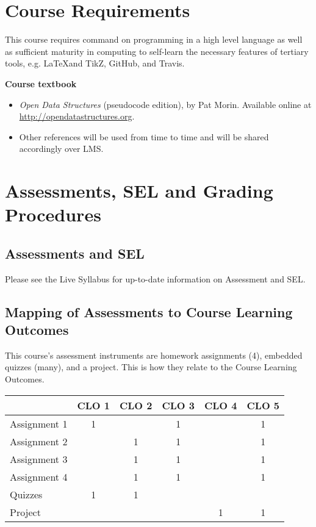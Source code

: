 \documentclass[a4paper]{article}
\begin{document}
\section{Course Requirements}

This course requires command on programming in a high level language as well as sufficient maturity in computing to self-learn the necessary features of tertiary tools, e.g. \LaTeX and TikZ, GitHub, and Travis.

\noindent\textbf{Course textbook}

\begin{itemize}
\item \textit{Open Data Structures} (pseudocode edition), by Pat Morin. Available online at \url{http://opendatastructures.org}.
\item Other references will be used from time to time and will be shared accordingly over LMS.
\end{itemize}

\section{Assessments, SEL and Grading Procedures}

\subsection{Assessments and SEL}

Please see the Live Syllabus for up-to-date information on Assessment and SEL.

\subsection{Mapping of Assessments to Course Learning Outcomes}

This course’s assessment instruments are homework assignments (4), embedded quizzes (many), and a project. This is how they relate to the Course Learning Outcomes.
\smallskip

\noindent
\begin{tabularx}{1.0\linewidth}{|l||*5{C|}}
  \hline
  &CLO 1& CLO 2& CLO 3& CLO 4& CLO 5\\  \hline\hline
  Assignment 1 & 1 & & 1 & & 1 \\\hline
  Assignment 2 & & 1 & 1 & & 1 \\\hline
  Assignment 3 & & 1 & 1 & & 1 \\\hline
  Assignment 4 & & 1 & 1 & & 1 \\\hline
  Quizzes & 1 & 1 & & & \\\hline
  Project & & & & 1 & 1 \\\hline
\end{tabularx}
\end{document}
